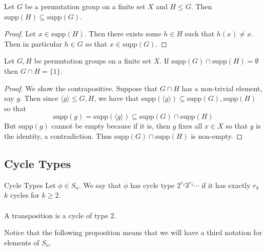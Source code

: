 \documentclass[a4paper]{article}
\begin{document}
\begin{lmm}{}{} Let $G$ be a permutation group on a finite set $X$ and $H\leq G$. Then $\text{supp}(H)\subseteq\text{supp}(G)$. \tcbline
\begin{proof}
Let $x\in\text{supp}(H)$. Then there exists some $h\in H$ such that $h(x)\neq x$. Then in particular $h\in G$ so that $x\in\text{supp}(G)$. 
\end{proof}
\end{lmm}

\begin{prp}{}{} Let $G,H$ be permutation groups on a finite set $X$. If $\text{supp}(G)\cap\text{supp}(H)=\emptyset$ then $G\cap H=\{1\}$. \tcbline
\begin{proof}
We show the contrapositive. Suppose that $G\cap H$ has a non-trivial element, say $g$. Then since $\langle g\rangle\leq G,H$, we have that $\text{supp}(\langle g\rangle)\subseteq\text{supp}(G),\text{supp}(H)$ so that $$\text{supp}(g)=\text{supp}(\langle g\rangle)\subseteq\text{supp}(G)\cap\text{supp}(H)$$ But $\text{supp}(g)$ cannot be empty because if it is, then $g$ fixes all $x\in X$ so that $g$ is the identity, a contradiction. Thus $\text{supp}(G)\cap\text{supp}(H)$ is non-empty. 
\end{proof}
\end{prp}

\subsection{Cycle Types}
\begin{defn}{Cycle Types}{} Let $\phi\in S_n$. We say that $\phi$ has cycle type $2^{r_2}3^{r_3}\cdots$ if it has exactly $r_k$ $k$ cycles for $k\geq 2$. \\~\\
A transposition is a cycle of type $2$. 
\end{defn}

Notice that the following proposition means that we will have a third notation for elements of $S_n$. 
\end{document}
